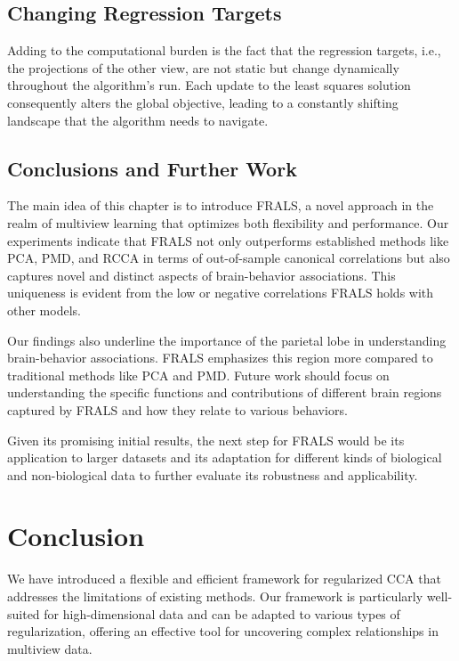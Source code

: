 \subsection{Changing Regression Targets}\label{subsec:changing-regression-targets}
Adding to the computational burden is the fact that the regression targets, i.e., the projections of the other view, are not static but change dynamically throughout the algorithm's run.
Each update to the least squares solution consequently alters the global objective, leading to a constantly shifting landscape that the algorithm needs to navigate.


\subsection{Conclusions and Further Work}
The main idea of this chapter is to introduce FRALS, a novel approach in the realm of multiview learning that optimizes
both flexibility and performance.
Our experiments indicate that FRALS not only outperforms established methods like PCA, PMD, and RCCA in terms of out-of-sample canonical correlations but also captures novel and distinct aspects of brain-behavior associations.
This uniqueness is evident from the low or negative correlations FRALS holds with other models.

Our findings also underline the importance of the parietal lobe in understanding brain-behavior associations.
FRALS emphasizes this region more compared to traditional methods like PCA and PMD. Future work should focus on understanding the specific functions and contributions of different brain regions captured by FRALS and how they relate to various behaviors.

Given its promising initial results, the next step for FRALS would be its application to larger datasets and its adaptation for different kinds of biological and non-biological data to further evaluate its robustness and applicability.



\section{Conclusion}

We have introduced a flexible and efficient framework for regularized CCA that addresses the limitations of existing methods.
Our framework is particularly well-suited for high-dimensional data and can be adapted to various types of regularization, offering an effective tool for uncovering complex relationships in multiview data.







